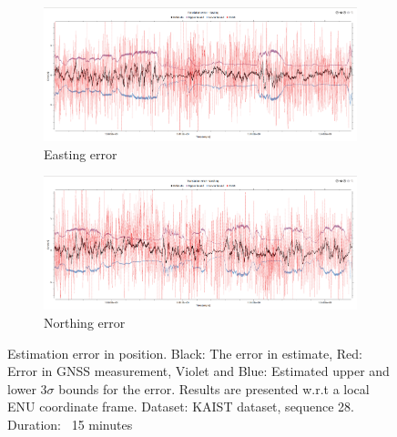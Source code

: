 \begin{figure}[htp]
	\centering
    \begin{subfigure}{\textwidth}
        \includegraphics[width=\textwidth]{figs/easting_error.png}
        \caption{Easting error}
    \end{subfigure}
    \begin{subfigure}{\textwidth}
        \includegraphics[width=\textwidth]{figs/northing_error.png}
        \caption{Northing error}
    \end{subfigure}
    \vspace{-0.4cm}
    \caption[Estimation error in position]{Estimation error in position. Black: The error in estimate, Red: Error in GNSS measurement, Violet and Blue: Estimated upper and lower 3$\sigma$ bounds for the error. Results are presented w.r.t a local ENU coordinate frame. Dataset: KAIST dataset, sequence 28. Duration: ~15 minutes}
    \label{fig:pa:estimationError}
    \vspace{0.5cm}
\end{figure}

